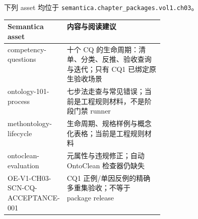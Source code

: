 下列 asset 均位于 \texttt{semantica.chapter\_packages.vol1.ch03}。

\begin{center}
\begin{tabularx}{\linewidth}{@{}>{\ttfamily\footnotesize}p{0.36\linewidth}X@{}}
\toprule
\normalfont\textbf{Semantica asset} & \textbf{内容与阅读建议} \\
\midrule
competency-questions & 十个 CQ 的生命周期：清单、分类、反推、验收查询与迭代；只有 CQ1 已绑定原生验收场景 \\
ontology-101-process & 七步法走查与常见错误；当前是工程规则材料，不是阶段门禁 runner \\
methontology-lifecycle & 生命周期、规格样例与概念化表格；当前是工程规则材料 \\
ontoclean-evaluation & 元属性与违规修正；自动 OntoClean 检查器仍缺失 \\
OE-V1-CH03-SCN-CQ-ACCEPTANCE-001 & CQ1 正例/单因反例的精确多重集验收；不等于 package release \\
\bottomrule
\end{tabularx}
\end{center}

